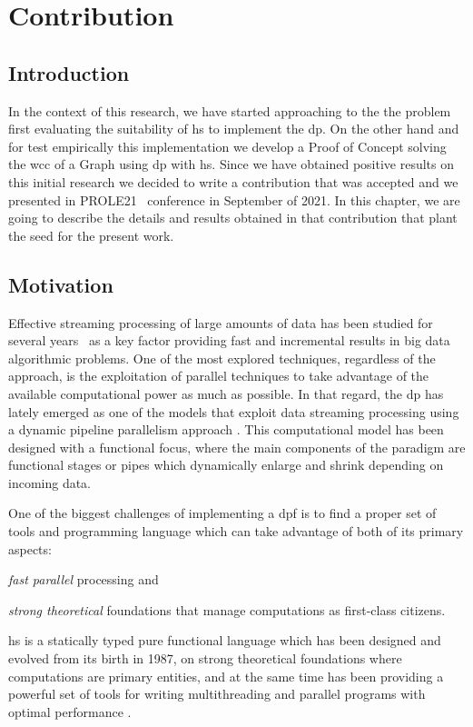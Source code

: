 \chapter{Contribution}
\section{Introduction}
In the context of this research, we have started approaching to the the problem first evaluating the suitability of \acrlong{hs}
to implement the \acrlong{dp}. On the other hand and for test empirically this implementation we develop a Proof of Concept solving 
the \acrlong{wcc} of a Graph using \acrlong{dp} with \acrshort{hs}.
Since we have obtained positive results on this initial research we decided to write a contribution that was accepted and we presented in PROLE21~\cite{prole21} 
conference in September of 2021.
In this chapter, we are going to describe the details and results obtained in that contribution that plant the seed for the present work.

\section{Motivation}
Effective streaming processing of large amounts of data has been studied for several years~\cite{enumeratingsg, exploting, onthefly} as a key factor providing fast and incremental 
results in big data algorithmic problems. One of the most explored techniques, regardless of the approach, is the exploitation of parallel techniques to take advantage of the available 
computational power as much as possible. In that regard, the \acrfull{dp} \cite{dpdef} has lately emerged as one of the models that exploit data streaming processing using a dynamic pipeline parallelism approach \cite{onthefly}. 
This computational model has been designed with a functional focus, where the main components of the paradigm are functional stages or pipes which dynamically enlarge and shrink depending on incoming data.  

One of the biggest challenges of implementing a \acrfull{dpf} is to find a proper set of tools and programming language which can take advantage of both of its primary aspects: \begin{inparaenum}[i\upshape)]
\item  \emph{fast parallel} processing and 
\item  \emph{strong theoretical} foundations that manage computations as first-class citizens.
 \end{inparaenum}
\acrfull{hs} is a statically typed pure functional language which has been designed and evolved from its birth in 1987, on strong theoretical foundations where computations are primary entities, 
and at the same time has been providing a powerful set of tools for writing multithreading and parallel programs with optimal performance \cite{parallelbook, monadpar}.

